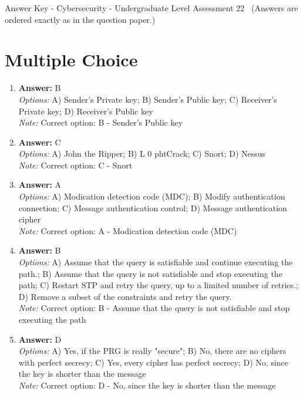 \documentclass[12pt]{article}
\begin{document}
\begin{center}
Answer Key - Cybersecurity - Undergraduate Level Assessment 22 \
\small (Answers are ordered exactly as in the question paper.)
\end{center}

\section*{Multiple Choice}
\begin{enumerate}[label=\arabic*.]
\item \textbf{Answer:} B
\\ \textit{Options:} A) Sender's Private key; B) Sender's Public key; C) Receiver's Private key; D) Receiver's Public key
\\ \textit{Note:} Correct option: B - Sender's Public key
\item \textbf{Answer:} C
\\ \textit{Options:} A) John the Ripper; B) L 0 phtCrack; C) Snort; D) Nessus
\\ \textit{Note:} Correct option: C - Snort
\item \textbf{Answer:} A
\\ \textit{Options:} A) Modication detection code (MDC); B) Modify authentication connection; C) Message authentication control; D) Message authentication cipher
\\ \textit{Note:} Correct option: A - Modication detection code (MDC)
\item \textbf{Answer:} B
\\ \textit{Options:} A) Assume that the query is satisfiable and continue executing the path.; B) Assume that the query is not satisfiable and stop executing the path; C) Restart STP and retry the query, up to a limited number of retries.; D) Remove a subset of the constraints and retry the query.
\\ \textit{Note:} Correct option: B - Assume that the query is not satisfiable and stop executing the path
\item \textbf{Answer:} D
\\ \textit{Options:} A) Yes, if the PRG is really "secure"; B) No, there are no ciphers with perfect secrecy; C) Yes, every cipher has perfect secrecy; D) No, since the key is shorter than the message
\\ \textit{Note:} Correct option: D - No, since the key is shorter than the message
\end{enumerate}
\end{document}
